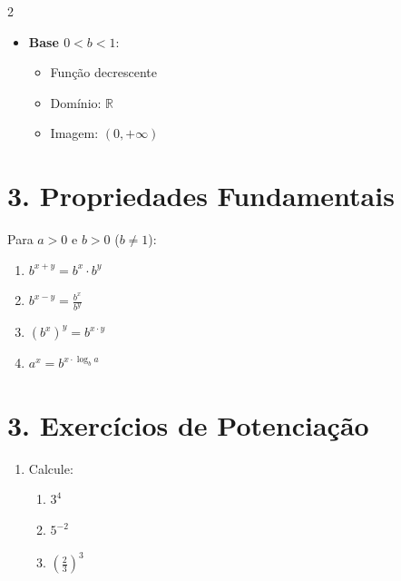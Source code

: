 \documentclass[11pt]{article}
\begin{document}
\begin{multicols}{2}
\begin{itemize}
        \item \textbf{Base $0 < b < 1$}:
            \begin{itemize}
                \item Função decrescente
                \item Domínio: $\mathbb{R}$
                \item Imagem: $(0, +\infty)$
            \end{itemize}
    \end{itemize}

    \begin{center}
    \end{center}

    \section*{3. Propriedades Fundamentais}
    Para $a > 0$ e $b > 0$ ($b \neq 1$):
    \begin{enumerate}
        \item $b^{x+y} = b^x \cdot b^y$
        \item $b^{x-y} = \frac{b^x}{b^y}$
        \item $(b^x)^y = b^{x \cdot y}$
        \item $a^x = b^{x \cdot \log_b a}$
    \end{enumerate}

    \section*{3. Exercícios de Potenciação}
    \begin{enumerate}
        \item Calcule:
            \begin{enumerate}[label=\alph*)]
                \item $3^4$
                \item $5^{-2}$
                \item $\left(\frac{2}{3}\right)^3$
            \end{enumerate}


\end{enumerate}
\end{multicols}
\end{document}
